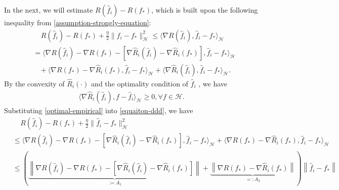 \documentclass{article}
\begin{document}
In the next, we will estimate $R(\hat{f}_i)-R(f_\ast)$,
which is built upon the following inequality from \eqref{assumption-strongly-equation}:
\begin{align}
\nonumber
  &~~~~~R(\hat{f}_i)-R(f_\ast)+\frac{\eta}{2}\|\hat{f}_i-f_\ast\|_\mathcal{H}^2
  \leq \langle \nabla R(\hat{f}_i),\hat{f}_i-f_\ast\rangle_\mathcal{H}
  \\ \nonumber &=\langle \nabla R(\hat{f}_i)-\nabla R(f_\ast)-[\nabla \hat{R}_i(\hat{f}_i)-\nabla \hat{R}_i(f_\ast)],
   \hat{f}_i-f_\ast\rangle_\mathcal{H}\\
   \label{equaiton-ddd}
   &~~~~+\langle\nabla R(f_\ast)-\nabla \hat{R}_i(f_\ast), \hat{f}_i-f_\ast\rangle_\mathcal{H}+\langle \nabla \hat{R}_i(\hat{f}_i), \hat{f}_i-f_\ast\rangle_\mathcal{H}.
\end{align}
By the convexity of $\hat{R}_i(\cdot)$ and the optimality condition of $\hat{f}_i$ \cite{boyd2004convex},
we have
\begin{align}
  \label{optimal-empirical}
  \langle \nabla \hat{R}_i(\hat{f}_i),f-\hat{f}_i\rangle_\mathcal{H}\geq 0, \forall f\in\mathcal{H}.
\end{align}
Substituting \eqref{optimal-empirical} into \eqref{equaiton-ddd}, we have
\begin{align}
  \nonumber
  &~~~~~R(\hat{f}_i)-R(f_\ast)+\frac{\eta}{2}\|\hat{f}_i-f_\ast\|_\mathcal{H}^2\\
  &\nonumber\leq \langle \nabla R(\hat{f}_i)-\nabla R(f_\ast)-[\nabla \hat{R}_i(\hat{f}_i)-\nabla \hat{R}_i(f_\ast)],
   \hat{f}_i-f_\ast\rangle_\mathcal{H}+\langle\nabla R(f_\ast)-\nabla \hat{R}_i(f_\ast), \hat{f}_i-f_\ast\rangle_\mathcal{H}\\
   \label{equation-important-middle}
   &\leq \left(\underbrace{\left\|\nabla R(\hat{f}_i)-\nabla R(f_\ast)-[\nabla \hat{R}_i(\hat{f}_i)-\nabla \hat{R}_i(f_\ast)]\right\|}_{:=A_1}+
   \underbrace{\left\|\nabla R(f_\ast)-\nabla \hat{R}_i(f_\ast)\right\|}_{=:A_2}\right)\left\|\hat{f}_i-f_\ast \right\|
\end{align}
\end{document}
